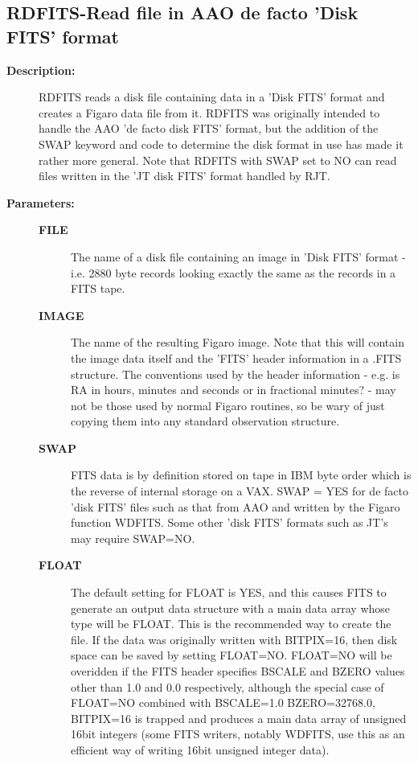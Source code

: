 \subsection{RDFITS-\label{RDFITS}Read file in AAO de facto 'Disk FITS' format}
\begin{description}

\item [{\bf Description:}]
 RDFITS reads a disk file containing data in a 'Disk FITS' format
 and creates a Figaro data file from it.  RDFITS was originally
 intended to handle the AAO 'de facto disk FITS' format, but the
 addition of the SWAP keyword and code to determine the disk
 format in use has made it rather more general.  Note that RDFITS
 with SWAP set to NO can read files written in the 'JT disk FITS'
 format handled by RJT.

\item [{\bf Parameters:}]
\begin{description}
\item [{\bf FILE}]
 The name of a disk file containing an image
 in 'Disk FITS' format - i.e. 2880 byte records looking
 exactly the same as the records in a FITS tape.
\item [{\bf IMAGE}]
 The name of the resulting Figaro image.  Note that
 this will contain the image data itself and the 'FITS'
 header information in a .FITS structure.  The conventions
 used by the header information - e.g. is RA in hours, minutes
 and seconds or in fractional minutes? - may not be those
 used by normal Figaro routines, so be wary of just copying
 them into any standard observation structure.
\item [{\bf SWAP}]
 FITS data is by definition stored on tape in IBM byte order
 which is the reverse of internal storage on a VAX.  SWAP =
 YES for de facto 'disk FITS' files such as that from AAO
 and written by the Figaro function WDFITS.  Some other 'disk
 FITS' formats such as JT's may require SWAP=NO.
\item [{\bf FLOAT}]
 The default setting for FLOAT is YES, and this causes
 FITS to generate an output data structure with a main
 data array whose type will be FLOAT.  This is the
 recommended way to create the file.  If the data was
 originally written with BITPIX=16, then disk space can
 be saved by setting FLOAT=NO.  FLOAT=NO will be overidden
 if the FITS header specifies BSCALE and BZERO values other
 than 1.0 and 0.0 respectively, although the special case
 of FLOAT=NO combined with BSCALE=1.0 BZERO=32768.0,
 BITPIX=16 is trapped and produces a main data array of
 unsigned 16bit integers (some FITS writers, notably WDFITS,
 use this as an efficient way of writing 16bit unsigned
 integer data).
\end{description}


\end{description}
